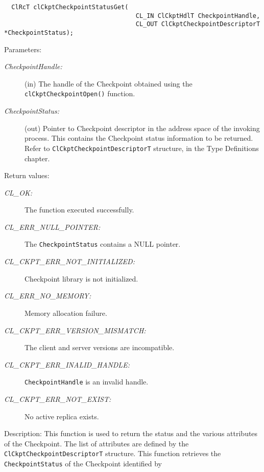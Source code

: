 \begin{flushleft}
\begin{Desc}
\footnotesize\begin{verbatim}  ClRcT clCkptCheckpointStatusGet(
                              		CL_IN ClCkptHdlT CheckpointHandle,
                              		CL_OUT ClCkptCheckpointDescriptorT *CheckpointStatus);
\end{verbatim}
\normalsize
\end{Desc}
\begin{Desc}
\item[Parameters:]
\begin{description}
\item[{\em Checkpoint\-Handle:}](in) The handle of the Checkpoint obtained using the {\tt{clCkptCheckpointOpen()}}
function. 
\item[{\em Checkpoint\-Status:}](out) Pointer to Checkpoint descriptor in the address space of the invoking
process. This contains the Checkpoint status information to be returned. Refer to
{\tt{ClCkptCheckpointDescriptorT}} structure, in the Type Definitions chapter.
\end{description}
\end{Desc}
\begin{Desc}
\item[Return values:]
\begin{description}
\item[{\em CL\_\-OK:}]The function executed successfully. 
\item[{\em CL\_\-ERR\_\-NULL\_\-POINTER:}]The {\tt{Checkpoint\-Status}} contains a NULL pointer. 
\item[{\em CL\_\-CKPT\_\-ERR\_\-NOT\_\-INITIALIZED:}]Checkpoint library is not initialized. 
\item[{\em CL\_\-ERR\_\-NO\_\-MEMORY:}]Memory allocation failure.
\item[{\em CL\_\-CKPT\_\-ERR\_\-VERSION\_\-MISMATCH:}]The client and server versions are incompatible.
\item[{\em CL\_\-CKPT\_\-ERR\_\-INALID\_\-HANDLE:}]{\tt{CheckpointHandle}} is an invalid handle.
\item[{\em CL\_\-CKPT\_\-ERR\_\-NOT\_\-EXIST:}] No active replica exists.
\end{description}
\end{Desc}
\begin{Desc}
\item[Description:]This function is used to return the status and the various attributes of the Checkpoint. The list of attributes are defined by the 
{\tt{ClCkptCheckpointDescriptorT}} structure. This function retrieves the {\tt{Checkpoint\-Status}} of the Checkpoint identified by 

\end{Desc}
\end{flushleft}
